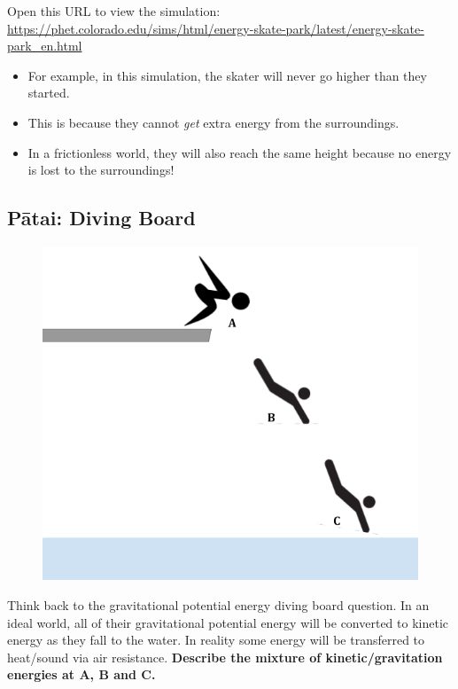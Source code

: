 \documentclass{report}
\begin{document}
Open this URL to view the simulation: \url{https://phet.colorado.edu/sims/html/energy-skate-park/latest/energy-skate-park_en.html}

\begin{itemize}
    \item For example, in this simulation, the skater will never go higher than they started.
    \item This is because they cannot \textit{get} extra energy from the surroundings.
    \item In a frictionless world, they will also reach the same height because no energy is lost to the surroundings!
\end{itemize}

\subsection{Pātai: Diving Board}
\begin{figure}
	\vspace{-1cm}
    \begin{center}
    	\includegraphics[width=0.9\linewidth]{conservation-of-energy-diving-board.png}
        \label{default}
    \end{center}
\end{figure}
Think back to the gravitational potential energy diving board question. In an ideal world, all of their gravitational potential energy will be converted to kinetic energy as they fall to the water. In reality some energy will be transferred to heat/sound via air resistance. \textbf{Describe the mixture of kinetic/gravitation energies at A, B and C.}
\end{document}
